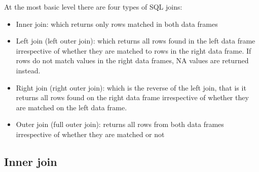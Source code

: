 \documentclass[
]{book}
\providecommand{\tightlist}{%
  \setlength{\itemsep}{0pt}\setlength{\parskip}{0pt}}
\begin{document}
At the most basic level there are four types of SQL joins:

\begin{itemize}
\tightlist
\item
  Inner join: which returns only rows matched in both data frames
\item
  Left join (left outer join): which returns all rows found in the left data frame irrespective of whether they are matched to rows in the right data frame. If rows do not match values in the right data frames, NA values are returned instead.
\item
  Right join (right outer join): which is the reverse of the left join, that is it returns all rows found on the right data frame irrespective of whether they are matched on the left data frame.
\item
  Outer join (full outer join): returns all rows from both data frames irrespective of whether they are matched or not
\end{itemize}

\hypertarget{inner-join}{%
\subsection{Inner join}\label{inner-join}}
\end{document}

